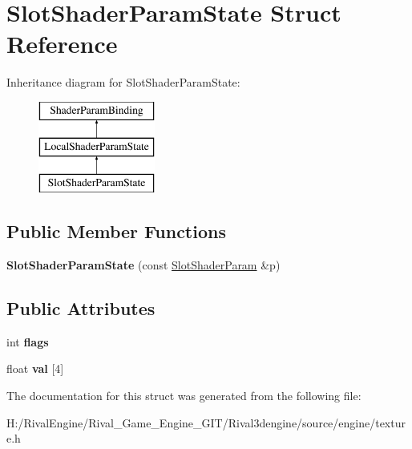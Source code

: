 \hypertarget{struct_slot_shader_param_state}{}\section{Slot\+Shader\+Param\+State Struct Reference}
\label{struct_slot_shader_param_state}
Inheritance diagram for Slot\+Shader\+Param\+State\+:\begin{figure}[H]
\begin{center}
\leavevmode
\includegraphics[height=3.000000cm]{struct_slot_shader_param_state}
\end{center}
\end{figure}
\subsection*{Public Member Functions}
\begin{DoxyCompactItemize}
\item 
\mbox{\label{struct_slot_shader_param_state_a3ef7705beb9e82061b7684fb4d4d025b}} 
{\bfseries Slot\+Shader\+Param\+State} (const \hyperlink{struct_slot_shader_param}{Slot\+Shader\+Param} \&p)
\end{DoxyCompactItemize}
\subsection*{Public Attributes}
\begin{DoxyCompactItemize}
\item 
\mbox{\label{struct_slot_shader_param_state_ab89ee7e52fd74536b3662786646eb026}} 
int {\bfseries flags}
\item 
\mbox{\label{struct_slot_shader_param_state_ad199c11e1c382f1eb86681274feb734a}} 
float {\bfseries val} \mbox{[}4\mbox{]}
\end{DoxyCompactItemize}


The documentation for this struct was generated from the following file\+:\begin{DoxyCompactItemize}
\item 
H\+:/\+Rival\+Engine/\+Rival\+\_\+\+Game\+\_\+\+Engine\+\_\+\+G\+I\+T/\+Rival3dengine/source/engine/texture.\+h\end{DoxyCompactItemize}
